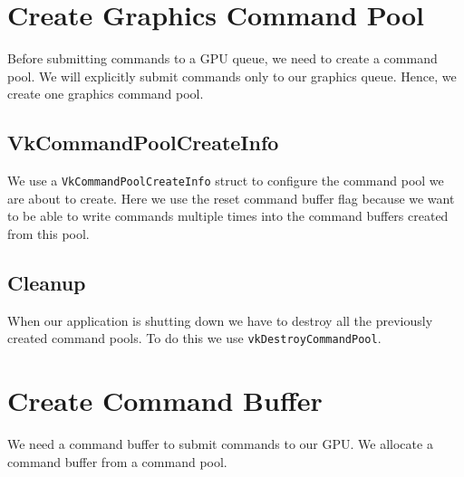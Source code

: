 \section{Create Graphics Command Pool}

Before submitting commands to a GPU queue, we need to create a command pool.
We will explicitly submit commands only to our graphics queue.
Hence, we create one graphics command pool.

\begin{minipage}{\linewidth}{\noindent}
    
\end{minipage}

\subsection{VkCommandPoolCreateInfo}

We use a \texttt{VkCommandPoolCreateInfo} struct to configure the command pool we are
about to create.
Here we use the reset command buffer flag because we want to be able to
write commands multiple times into the command buffers created from this pool.

\begin{minipage}{\linewidth}{\noindent}
    
\end{minipage}

\subsection{Cleanup}

When our application is shutting down we have to destroy all the previously created
command pools.
To do this we use \texttt{vkDestroyCommandPool}.

\section{Create Command Buffer}

We need a command buffer to submit commands to our GPU.
We allocate a command buffer from a command pool.

\begin{minipage}{\linewidth}{\noindent}
    
\end{minipage}

